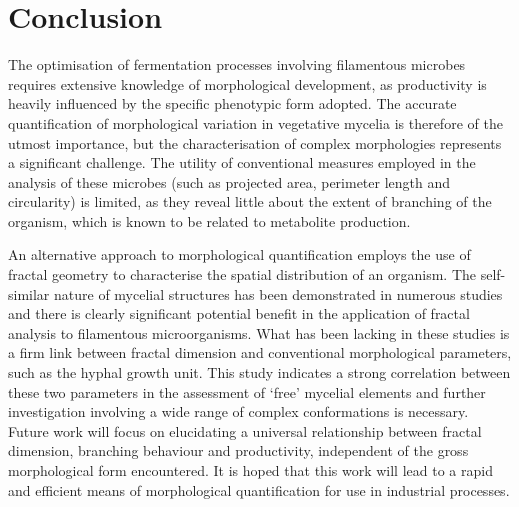 \section{Conclusion}

The optimisation of fermentation processes involving filamentous microbes requires extensive knowledge of morphological development, as productivity is heavily influenced by the specific phenotypic form adopted. The accurate quantification of morphological variation in vegetative mycelia is therefore of the utmost importance, but the characterisation of complex morphologies represents a significant challenge. The utility of conventional measures employed in the analysis of these microbes (such as projected area, perimeter length and circularity) is limited, as they reveal little about the extent of branching of the organism, which is known to be related to metabolite production.

An alternative approach to morphological quantification employs the use of fractal geometry to characterise the spatial distribution of an organism. The self-similar nature of mycelial structures has been demonstrated in numerous studies and there is clearly significant potential benefit in the application of fractal analysis to filamentous microorganisms. What has been lacking in these studies is a firm link between fractal dimension and conventional morphological parameters, such as the hyphal growth unit. This study indicates a strong correlation between these two parameters in the assessment of \lq free' mycelial elements and further investigation involving a wide range of complex conformations is necessary. Future work will focus on elucidating a universal relationship between fractal dimension, branching behaviour and productivity, independent of the gross morphological form encountered. It is hoped that this work will lead to a rapid and efficient means of morphological quantification for use in industrial processes.